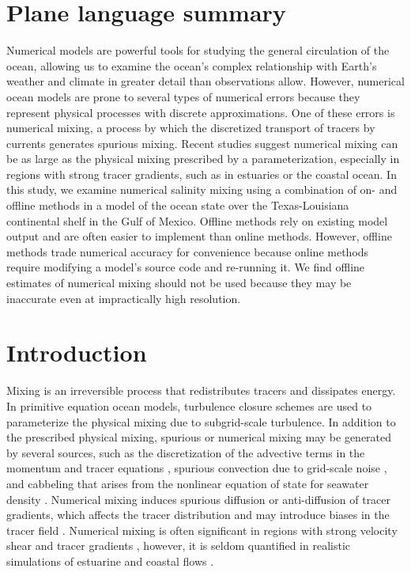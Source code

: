 \section{Plane language summary}
Numerical models are powerful tools for studying the general circulation of the ocean, allowing us to examine the ocean's complex relationship with Earth's weather and climate in greater detail than observations allow. However, numerical ocean models are prone to several types of numerical errors because they represent physical processes with discrete approximations. One of these errors is numerical mixing, a process by which the discretized transport of tracers by currents generates spurious mixing. Recent studies suggest numerical mixing can be as large as the physical mixing prescribed by a parameterization, especially in regions with strong tracer gradients, such as in estuaries or the coastal ocean. In this study, we examine numerical salinity mixing using a combination of on- and offline methods in a model of the ocean state over the Texas-Louisiana continental shelf in the Gulf of Mexico. Offline methods rely on existing model output and are often easier to implement than online methods. However, offline methods trade numerical accuracy for convenience because online methods require modifying a model's source code and re-running it. We find offline estimates of numerical mixing should not be used because they may be inaccurate even at impractically high resolution.

\section{Introduction}
Mixing is an irreversible process that redistributes tracers and dissipates energy. In primitive equation ocean models, turbulence closure schemes are used to parameterize the physical mixing due to subgrid-scale turbulence. In addition to the prescribed physical mixing, spurious or numerical mixing may be generated by several sources, such as the discretization of the advective terms in the momentum and tracer equations \citep{Burchard_2008, gibson2017attribution, Griffies_2000, Smolarkiewicz_1983}, spurious convection due to grid-scale noise \citep{ilicak2016quantifying,Ilicak_2012}, and cabbeling that arises from the nonlinear equation of state for seawater density \citep{Ilicak_2012, mcdougall1987thermobaricity}. Numerical mixing induces spurious diffusion or anti-diffusion of tracer gradients, which affects the tracer distribution and may introduce biases in the tracer field \citep{Holmes_2021}. Numerical mixing is often significant in regions with strong velocity shear and tracer gradients \citep{Fringer_2019, Kalra_2019, Rennau_2009}, however, it is seldom quantified in realistic simulations of estuarine and coastal flows \citep{Broatch_2022, Ralston_2017, Wang_2021}.

